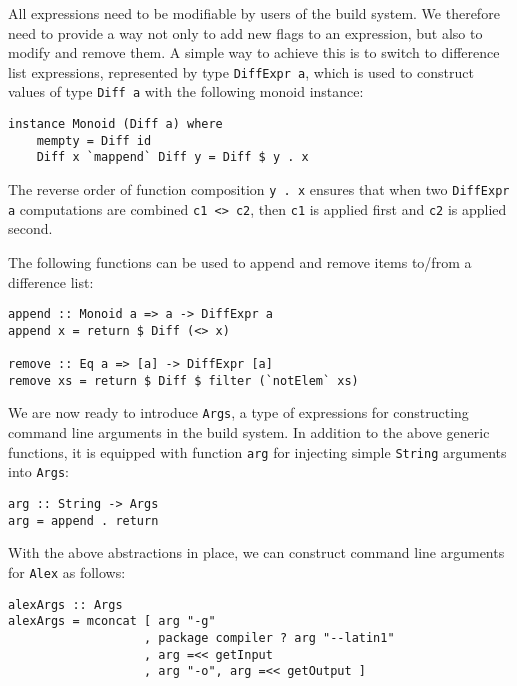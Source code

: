 
All expressions need to be modifiable by users of the build system. We therefore
need to provide a way not only to add new flags to an expression, but also to
modify and remove them. A simple way to achieve this is to switch to difference
list expressions, represented by type \texttt{DiffExpr a}, which is used to
construct values of type \texttt{Diff a} with the following monoid instance:

\begin{lstlisting}[basicstyle=\ttfamily]
instance Monoid (Diff a) where
    mempty = Diff id
    Diff x `mappend` Diff y = Diff $ y . x
\end{lstlisting}

The reverse order of function composition \texttt{y . x} ensures that when two
\texttt{DiffExpr a} computations are combined \texttt{c1 <> c2}, then
\texttt{c1} is applied first and \texttt{c2} is applied second.

The following functions can be used to append and remove items to/from a
difference list:

\begin{lstlisting}[basicstyle=\ttfamily]
append :: Monoid a => a -> DiffExpr a
append x = return $ Diff (<> x)

remove :: Eq a => [a] -> DiffExpr [a]
remove xs = return $ Diff $ filter (`notElem` xs)
\end{lstlisting}

We are now ready to introduce \texttt{Args}, a type of expressions for
constructing command line arguments in the build system. In addition to the
above generic functions, it is equipped with function \texttt{arg} for injecting
simple \texttt{String} arguments into \texttt{Args}:

\begin{lstlisting}[basicstyle=\ttfamily]
arg :: String -> Args
arg = append . return
\end{lstlisting}

With the above abstractions in place, we can construct command line arguments
for \texttt{Alex} as follows:

\begin{lstlisting}[basicstyle=\ttfamily]
alexArgs :: Args
alexArgs = mconcat [ arg "-g"
                   , package compiler ? arg "--latin1" 
                   , arg =<< getInput
                   , arg "-o", arg =<< getOutput ]
\end{lstlisting}

